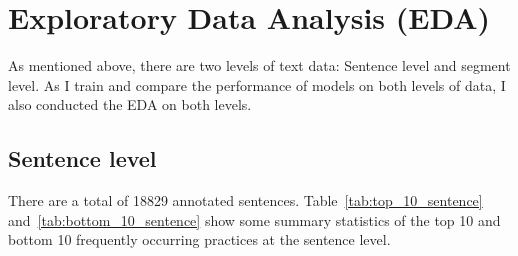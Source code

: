 
\chapter{Exploratory Data Analysis (EDA)} %

\label{chapter3} %

As mentioned above, there are two levels of text data: Sentence level and segment level. As I train and compare the performance of models on both levels of data, I also conducted the EDA on both levels.


\section{Sentence level}

There are a total of 18829 annotated sentences. Table~\ref{tab:top_10_sentence} and~\ref{tab:bottom_10_sentence} show some summary statistics of the top 10 and bottom 10 frequently occurring practices at the sentence level. 

